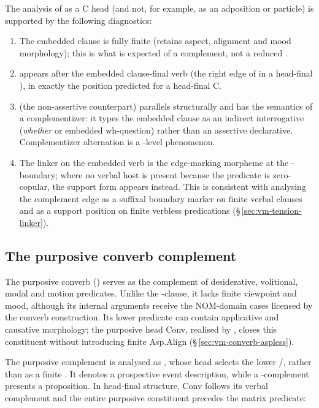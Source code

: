 The analysis of  as a C head (and not, for example, as an
adposition or particle) is supported by the following diagnostics:
\begin{enumerate}
\item The embedded clause is fully finite (retains aspect,
  alignment and mood morphology); this is what is
  expected of a  complement, not a reduced .
\item {} appears after the embedded clause-final verb
  (the right edge of  in a head-final ), in exactly the
  position predicted for a head-final C.
\item {} (the non-assertive counterpart) parallels 
  structurally and has the semantics of a complementizer: it
  types the embedded clause as an indirect interrogative
  (\textit{whether} or embedded wh-question) rather than an
  assertive declarative. Complementizer alternation is a
  -level phenomenon.
\item The linker  on the embedded verb is the edge-marking
  morpheme at the - boundary; where no verbal host is
  present because the predicate is zero-copular, the support form 
  appears instead. This is consistent with analysing the complement edge as a
  suffixal boundary marker on finite verbal clauses and as a support position
  on finite verbless predications (§\,\ref{sec:vm-tension-linker}).
\end{enumerate}

\subsection{The purposive converb complement}
\label{sec:vm-purp-comp}

The purposive converb () serves as the complement of
desiderative, volitional, modal and motion predicates. Unlike the
-clause, it lacks finite viewpoint and mood, although its internal
arguments receive the NOM-domain cases licensed by the converb construction.
Its lower predicate can contain applicative and causative morphology; the
purposive head Conv, realised by , closes this constituent without
introducing finite Asp.Align (§\,\ref{sec:vm-converb-aspless}).

The purposive complement is analysed as , whose head selects
the lower /, rather than as a finite
. It denotes a prospective event description, while a
-complement presents a proposition. In head-final structure, Conv
follows its verbal complement and the entire purposive constituent precedes
the matrix predicate:

